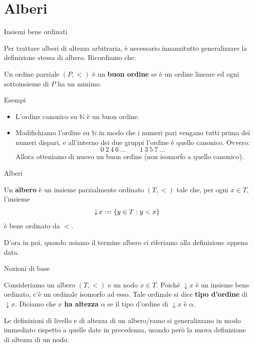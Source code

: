 \documentclass{beamer}
\theoremstyle{num.custom-title}
\theoremstyle{custom-title}
\DeclareMathOperator{\down}{\downarrow}
\newcommand{\N}{\mathbb{N}}
\newcommand*{\defeq}{\mathrel{\rlap{%
                     \raisebox{0.3ex}{$\cdot$}}%
                     \raisebox{-0.3ex}{$\cdot$}}%
                     =}
\renewcommand{\emph}[1]{\textbf{#1}}
\begin{document}
\section{Alberi}

\begin{frame}{Insiemi bene ordinati}

Per trattare alberi di altezza arbitraria, è necessario innanzitutto generalizzare la definizione stessa di albero. Ricordiamo che:

\begin{definition}
Un ordine parziale $(P,<)$ è un \emph{buon ordine} se è un ordine lineare ed ogni sottoinsieme di $P$ ha un minimo.
\end{definition}

\pause

\begin{exampleblock}{Esempi}
\begin{itemize}
\item L'ordine canonico su $\N$ è un buon ordine.
\item Modifichiamo l'ordine su $\N$ in modo che i numeri pari vengano tutti prima dei numeri dispari, e all'interno dei due gruppi l'ordine è quello canonico. Ovvero:
\[
0 \ 2 \ 4 \ 6 \ \ldots \quad \quad 1 \ 3 \ 5 \ 7 \ \ldots
\]
Allora otteniamo di nuovo un buon ordine (non isomorfo a quello canonico).
\vspace{-7pt}
\end{itemize}
\end{exampleblock}

\end{frame}


\begin{frame}{Alberi}

\begin{definition}
Un \emph{albero} è un insieme parzialmente ordinato $(T,<)$ tale che, per ogni $x \in T$, l'insieme
\[
\down x \defeq \{y \in T : y < x\}
\]
è bene ordinato da $<$.
\end{definition}

D'ora in poi, quando usiamo il termine albero ci riferiamo alla definizione appena data.

\end{frame}


\begin{frame}{Nozioni di base}

Consideriamo un albero $(T,<)$ e un nodo $x \in T$. Poiché $\down x$ è un insieme bene ordinato, c'è un ordinale isomorfo ad esso. Tale ordinale si dice \emph{tipo d'ordine} di $\down x$. Diciamo che $x$ \emph{ha altezza} $\alpha$ se il tipo d'ordine di $\down x$ è $\alpha$.

\pause

Le definizioni di livello e di altezza di un albero/ramo si generalizzano in modo immediato rispetto a quelle date in precedenza, usando però la nuova definizione di altezza di un nodo.

\end{frame}
\end{document}
